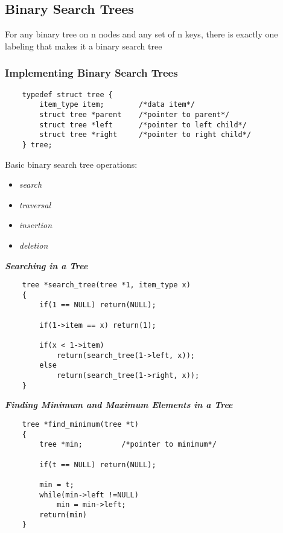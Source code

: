 \subsection{Binary Search Trees}

For any binary tree on n nodes and any set of n keys, there is exactly one labeling that makes it a binary search tree \\

\subsubsection{Implementing Binary Search Trees}

\begin{verbatim}
    typedef struct tree {
        item_type item;        /*data item*/
        struct tree *parent    /*pointer to parent*/
        struct tree *left      /*pointer to left child*/
        struct tree *right     /*pointer to right child*/
    } tree;
\end{verbatim}

Basic binary search tree operations:
\begin{itemize}
	\item \emph{search}
	\item \emph{traversal}
	\item \emph{insertion}
	\item \emph{deletion}
\end{itemize}

\textbf{ \emph{Searching in a Tree} }\\

\begin{verbatim}
    tree *search_tree(tree *1, item_type x)
    {
        if(1 == NULL) return(NULL);

        if(1->item == x) return(1);

        if(x < 1->item)
            return(search_tree(1->left, x));
        else
            return(search_tree(1->right, x));
    }
\end{verbatim}

\textbf{ \emph{Finding Minimum and Maximum Elements in a Tree} }\\

\begin{verbatim}
    tree *find_minimum(tree *t)
    {
        tree *min;         /*pointer to minimum*/

        if(t == NULL) return(NULL);

        min = t;
        while(min->left !=NULL)
            min = min->left;
        return(min)
    }
\end{verbatim}

